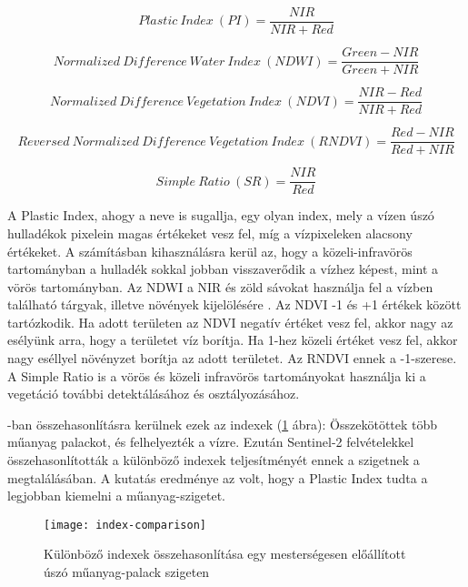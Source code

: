 \begin{equation}\label{eq:pi}
    Plastic \ Index \ (PI) = \frac{NIR}{NIR + Red}
\end{equation}

\begin{equation}\label{eq:ndwi}
    Normalized \ Difference \ Water \ Index \ (NDWI) = \frac{Green - NIR}{Green + NIR}
\end{equation}

\begin{equation}\label{eq:ndvi}
    Normalized \ Difference \ Vegetation \ Index \ (NDVI) = \frac{NIR - Red}{NIR + Red}
\end{equation}

\begin{equation}\label{eq:rndvi}
    Reversed \ Normalized \ Difference \ Vegetation \ Index \ (RNDVI) = \frac{Red - NIR}{Red + NIR}
\end{equation}

\begin{equation}\label{eq:sr}
    Simple \ Ratio \ (SR) = \frac{NIR}{Red}
\end{equation}

A Plastic Index, ahogy a neve is sugallja, egy olyan index, mely a vízen úszó hulladékok pixelein magas értékeket vesz fel, míg a vízpixeleken alacsony értékeket. A számításban kihasználásra kerül az, hogy a közeli-infravörös tartományban a hulladék sokkal jobban visszaverődik a vízhez képest, mint a vörös tartományban. Az NDWI a NIR és zöld sávokat használja fel a vízben található tárgyak, illetve növények kijelölésére \cite{McFeeters1996}. Az NDVI -1 és +1 értékek között tartózkodik. Ha adott területen az NDVI negatív értéket vesz fel, akkor nagy az esélyünk arra, hogy a területet víz borítja. Ha 1-hez közeli értéket vesz fel, akkor nagy eséllyel növényzet borítja az adott területet. Az RNDVI ennek a -1-szerese. A Simple Ratio is a vörös és közeli infravörös tartományokat használja ki a vegetáció további detektálásához és osztályozásához. 

\cite{Themistocleous2020}-ban összehasonlításra kerülnek ezek az indexek (\ref{fig:index-comparison} ábra): Összekötöttek több műanyag palackot, és felhelyezték a vízre. Ezután Sentinel-2 felvételekkel összehasonlították a különböző indexek teljesítményét ennek a szigetnek a megtalálásában. A kutatás eredménye az volt, hogy a Plastic Index tudta a legjobban kiemelni a műanyag-szigetet.

\begin{figure}[H]
	\centering
	\texttt{[image: index-comparison]}
	\caption{Különböző indexek összehasonlítása egy mesterségesen előállított úszó műanyag-palack szigeten \cite{Themistocleous2020}}
    \label{fig:index-comparison}
\end{figure}

